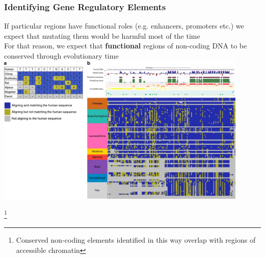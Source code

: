 \documentclass{beamer}
\newcommand\blfootnote[1]{%
	\begingroup
	\renewcommand\thefootnote{}\footnote{#1}%
	\addtocounter{footnote}{-1}%
	\endgroup
}
\begin{document}
\begin{frame}
	
	\frametitle{Identifying Gene Regulatory Elements}
\scriptsize	If particular regions have functional roles (e.g. enhancers, promoters etc.) we expect that mutating them would be harmful most of the time\\
	For that reason, we expect that \textbf{functional} regions of non-coding DNA to be conserved through evolutionary time
\pause
				\includegraphics[keepaspectratio, width  = 0.9\textwidth]{img/sequenceConservation}
				
\blfootnote{Conserved non-coding elements identified in this way overlap with regions of accessible chromatin}
\end{frame}
\end{document}
